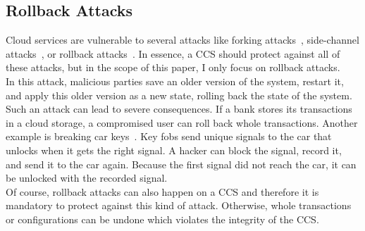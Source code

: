 \subsection{Rollback Attacks}
Cloud services are vulnerable to several attacks like forking attacks~\cite{forkingAttacks}, side-channel attacks~\cite{sideChannel}, or rollback attacks~\cite{Rollback}. In essence, a CCS should protect against all of these attacks, but in the scope of this paper, I only focus on rollback attacks.\\
In this attack, malicious parties save an older version of the system, restart it, and apply this older version as a new state, rolling back the state of the system. Such an attack can lead to severe consequences. If a bank stores its transactions in a cloud storage, a compromised user can roll back whole transactions. Another example is breaking car keys~\cite{rolljam}. Key fobs send unique signals to the car that unlocks when it gets the right signal. A hacker can block the signal, record it, and send it to the car again. Because the first signal did not reach the car, it can be unlocked with the recorded signal.\\%
Of course, rollback attacks can also happen on a CCS and therefore it is mandatory to protect against this kind of attack. Otherwise, whole transactions or configurations can be undone which violates the integrity of the CCS.